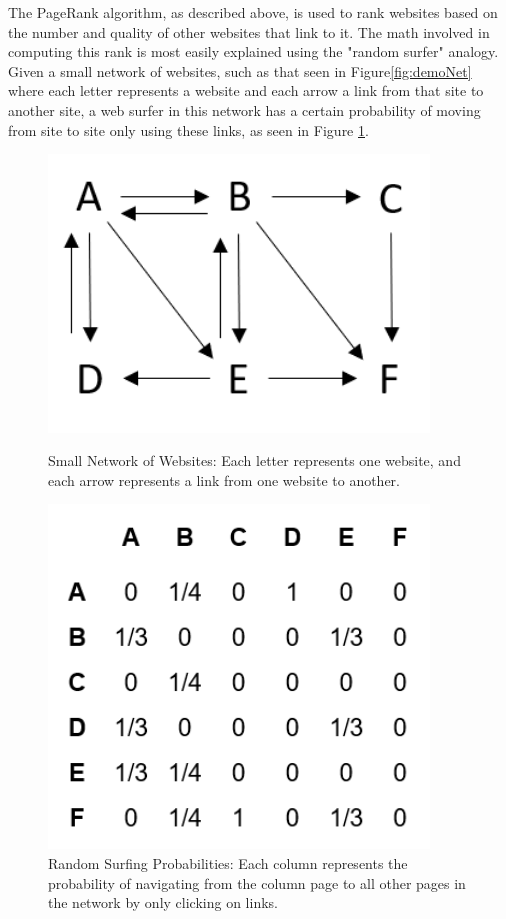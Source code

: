 \documentclass[]{report}   %
\begin{document}
The PageRank algorithm, as described above, is used to rank websites based on the number and quality of other websites that link to it. The math involved in computing this rank is most easily explained using the "random surfer" analogy. Given a small network of websites, such as that seen in Figure\ref{fig:demoNet} where each letter represents a website and each arrow a link from that site to another site, a web surfer in this network has a certain probability of moving from site to site only using these links, as seen in Figure \ref{fig:demoProb}. 
\begin{figure}[h]
    \centering
    \begin{minipage}{0.48\textwidth}
        \centering
        \includegraphics[width=0.9\textwidth]{Marbut_DemoNetwork.png} %
        \caption{Small Network of Websites: Each letter represents one website, and each arrow represents a link from one website to another.}
	  \label{fig:demoNet}
    \end{minipage}\hfill
    \begin{minipage}{0.48\textwidth}
        \centering
        \includegraphics[width=0.9\textwidth]{Marbut_DemoMatrix.png} %
        \caption{Random Surfing Probabilities: Each column represents the probability of navigating from the column page to all other pages in the network by only clicking on links.}
	  \label{fig:demoProb}
    \end{minipage}
\end{figure}
\end{document}
